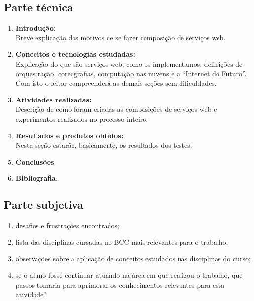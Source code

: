 \documentclass[11pt,a4paper]{article}
\begin{document}
\subsection{Parte técnica}
\begin{enumerate}
\item \textbf{Introdução:}  \\ Breve explicação dos motivos de se fazer composição de serviços web.
\item \textbf{Conceitos e tecnologias estudadas:}  \\ Explicação do que são serviços web, como os implementamos, definições de orquestração, coreografias, computação nas nuvens e a ``Internet do Futuro''. Com isto o leitor compreenderá as demais seções sem dificuldades.
\item \textbf{Atividades realizadas:}  \\ Descrição de como foram criadas as composições de serviços web e experimentos realizados no processo inteiro.
\item \textbf{Resultados e produtos obtidos:}  \\ Nesta seção estarão, basicamente, os resultados dos testes.
\item \textbf{Conclusões}. 
\item \textbf{Bibliografia.} 
\end{enumerate}


\subsection{Parte subjetiva}
\begin{enumerate}
\item desafios e frustrações encontrados;
\item lista das disciplinas cursadas no BCC mais relevantes para o trabalho;
\item observações sobre a aplicação de conceitos estudados nas disciplinas do curso;
\item se o aluno fosse continuar atuando na área em que realizou o trabalho, que passos tomaria para aprimorar os conhecimentos relevantes para esta atividade?
\end {enumerate}
\end{document}
